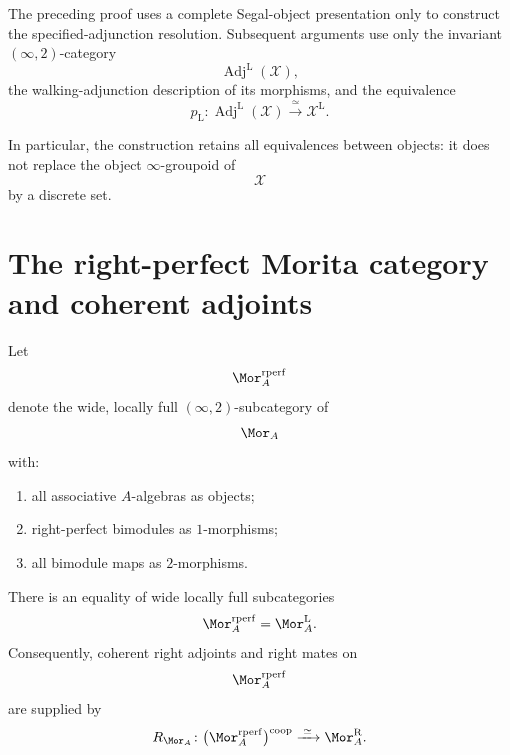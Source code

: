 \begin{remark}
\label{rem:specified-adjunction-resolution-invariant}
The preceding proof uses a complete Segal-object presentation only to
construct the specified-adjunction resolution. Subsequent arguments use
only the invariant $(\infty,2)$-category
\[
    \operatorname{Adj}^{\mathrm L}(\mathcal X),
\]
the walking-adjunction description of its morphisms, and the equivalence
\[
    p_{\mathrm L}
    \colon
    \operatorname{Adj}^{\mathrm L}(\mathcal X)
    \xrightarrow{\;\simeq\;}
    \mathcal X^{\mathrm L}.
\]

In particular, the construction retains all equivalences between
objects: it does not replace the object $\infty$-groupoid of
\[
    \mathcal X
\]
by a discrete set.
\end{remark}

\section{The right-perfect Morita category and coherent adjoints}
\label{sec:right-perfect-morita-coherent-adjoints}

\begin{definition}
\label{def:right-perfect-morita-category}
Let
\[
    \Mor_A^{\mathrm{rperf}}
\]
denote the wide, locally full $(\infty,2)$-subcategory of
\[
    \Mor_A
\]
with:
\begin{enumerate}[label=(\roman*)]
    \item all associative $A$-algebras as objects;

    \item right-perfect bimodules as $1$-morphisms;

    \item all bimodule maps as $2$-morphisms.
\end{enumerate}
\end{definition}

\begin{proposition}
\label{prop:right-perfect-mate-calculus}
There is an equality of wide locally full subcategories
\[
    \Mor_A^{\mathrm{rperf}}
    =
    \Mor_A^{\mathrm L}.
\]
Consequently, coherent right adjoints and right mates on
\[
    \Mor_A^{\mathrm{rperf}}
\]
are supplied by
\[
    R_{\Mor_A}
    \colon
    \bigl(
        \Mor_A^{\mathrm{rperf}}
    \bigr)^{\mathrm{coop}}
    \xrightarrow{\;\simeq\;}
    \Mor_A^{\mathrm R}.
\]
\end{proposition}

